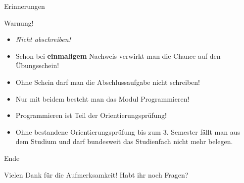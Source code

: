 \documentclass[18pt]{beamer}
\begin{document}
\begin{frame}{Erinnerungen}
\begin{alertblock}{Warnung!}
\begin{itemize}
\item \emph{\f{Nicht abschreiben!}}

\item Schon bei \textbf{einmaligem} Nachweis verwirkt man die Chance auf den Übungsschein!

\item Ohne Schein darf man die Abschlussaufgabe nicht schreiben!

\item Nur mit beidem besteht man das Modul Programmieren!

\item Programmieren ist Teil der Orientierungsprüfung!

\item Ohne bestandene Orientierungsprüfung bis zum 3. Semester fällt man aus dem Studium und darf bundesweit das Studienfach nicht mehr belegen.
\end{itemize}
\end{alertblock}
\end{frame}


\begin{frame}{Ende}
	\begin{center}
	\huge{Vielen Dank für die Aufmerksamkeit!}
	\normalsize Habt ihr noch Fragen?
	\end{center}
\end{frame}

\appendix
\beginbackup


\backupend
\end{document}

